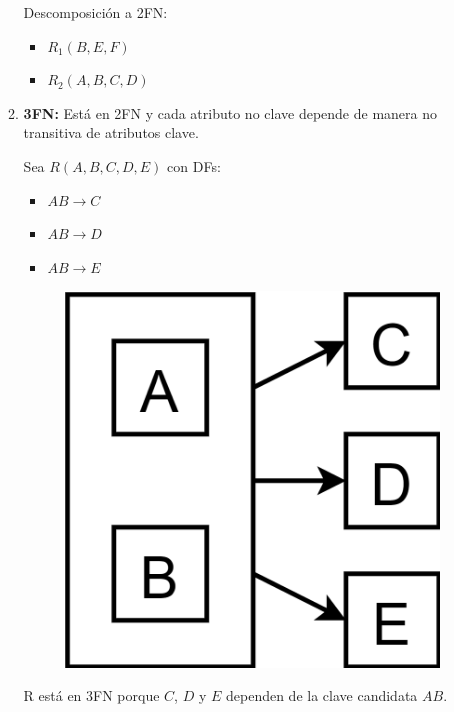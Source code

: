 \documentclass{templateNote}
\begin{document}
\begin{itemize}
\begin{enumerate}
        Descomposición a 2FN:
        \begin{itemize}
            \item $R_1(B,E,F)$
            \item $R_2(A,B,C,D)$
        \end{itemize}

        \newpage
        \item \textbf{3FN:} Está en 2FN y cada atributo no clave depende de manera no transitiva de atributos clave.
        
        
        Sea $R(A,B,C,D,E)$ con DFs:
        \begin{itemize}
            \item $AB \rightarrow C$
            \item $AB \rightarrow D$
            \item $AB \rightarrow E$
        \end{itemize}

        \begin{figure}[H]
            \centering
            \colorbox{green!20!white}{\includegraphics[scale=0.08]{img/3FN.png}}
        \end{figure}

        R está en 3FN porque $C$, $D$ y $E$ dependen de la clave candidata $AB$.
        

\end{enumerate}
\end{itemize}
\end{document}
